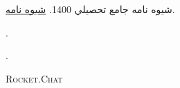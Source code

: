 \providecommand{\noopsort}[1]{}
\begin{thebibliography}{4}


\textsc{شيوه نامه جامع تحصيلي 1400}.
\newblock \href{https://edu.um.ac.ir/images/131/stories/pdf/1400/shivename1400.pdf}{شیوه نامه}.


\textsc{}.
\newblock {}


\textsc{}.
\newblock \href{https://rasa.com/docs/}{}

\textsc{Rocket.Chat}
\newblock \href{https://www.rocket.chat/}{}

\end{thebibliography}
